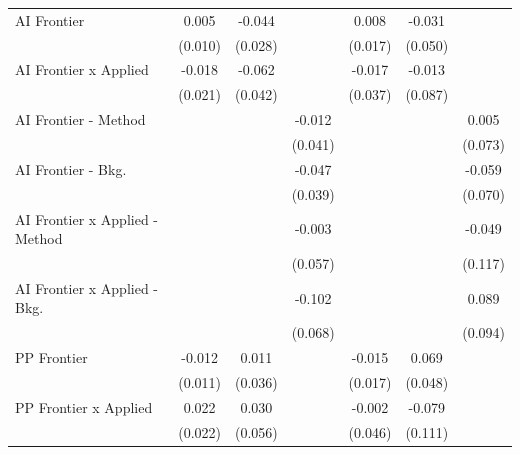\begin{tabular}{lcccccc}
   AI Frontier                    & 0.005         & -0.044        &               & 0.008        & -0.031        &   \\   
                                  & (0.010)       & (0.028)       &               & (0.017)      & (0.050)       &   \\   
   AI Frontier x Applied          & -0.018        & -0.062        &               & -0.017       & -0.013        &   \\   
                                  & (0.021)       & (0.042)       &               & (0.037)      & (0.087)       &   \\   
   AI Frontier - Method           &               &               & -0.012        &              &               & 0.005\\   
                                  &               &               & (0.041)       &              &               & (0.073)\\   
   AI Frontier - Bkg.             &               &               & -0.047        &              &               & -0.059\\   
                                  &               &               & (0.039)       &              &               & (0.070)\\   
   AI Frontier x Applied - Method &               &               & -0.003        &              &               & -0.049\\   
                                  &               &               & (0.057)       &              &               & (0.117)\\   
   AI Frontier x Applied - Bkg.   &               &               & -0.102        &              &               & 0.089\\   
                                  &               &               & (0.068)       &              &               & (0.094)\\   
   PP Frontier                    & -0.012        & 0.011         &               & -0.015       & 0.069         &   \\   
                                  & (0.011)       & (0.036)       &               & (0.017)      & (0.048)       &   \\   
   PP Frontier x Applied          & 0.022         & 0.030         &               & -0.002       & -0.079        &   \\   
                                  & (0.022)       & (0.056)       &               & (0.046)      & (0.111)       &   \\   

\end{tabular}
